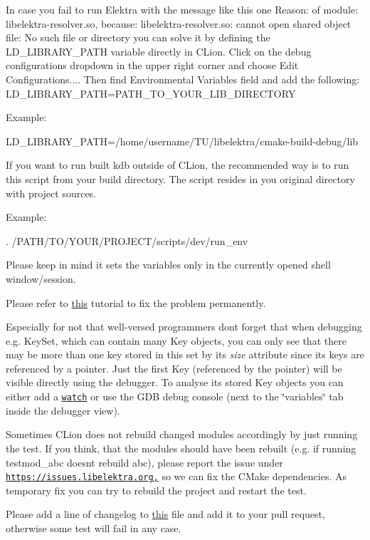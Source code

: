 In case you fail to run Elektra with the message like this one {\ttfamily Reason\+: of module\+: libelektra-\/resolver.\+so, because\+: libelektra-\/resolver.\+so\+: cannot open shared object file\+: No such file or directory} you can solve it by defining the L\+D\+\_\+\+L\+I\+B\+R\+A\+R\+Y\+\_\+\+P\+A\+TH variable directly in C\+Lion. Click on the debug configurations dropdown in the upper right corner and choose \textquotesingle{}Edit Configurations...\textquotesingle{}. Then find \textquotesingle{}Environmental Variables\textquotesingle{} field and add the following\+: L\+D\+\_\+\+L\+I\+B\+R\+A\+R\+Y\+\_\+\+P\+A\+TH=P\+A\+T\+H\+\_\+\+T\+O\+\_\+\+Y\+O\+U\+R\+\_\+\+L\+I\+B\+\_\+\+D\+I\+R\+E\+C\+T\+O\+RY

Example\+:

L\+D\+\_\+\+L\+I\+B\+R\+A\+R\+Y\+\_\+\+P\+A\+TH=/home/username/\+T\+U/libelektra/cmake-\/build-\/debug/lib

If you want to run built {\ttfamily kdb} outside of C\+Lion, the recommended way is to run this script from your build directory. The script resides in you original directory with project sources.

Example\+:


\begin{DoxyCode}
. /PATH/TO/YOUR/PROJECT/scripts/dev/run\_env
\end{DoxyCode}


Please keep in mind it sets the variables only in the currently opened shell window/session.

Please refer to \hyperlink{doc_COMPILE_md}{this} tutorial to fix the problem permanently.


\begin{DoxyItemize}
\item Especially for not that well-\/versed programmers don\textquotesingle{}t forget that when debugging e.\+g. {\ttfamily Key\+Set}, which can contain many {\ttfamily Key} objects, you can only see that there may be more than one key stored in this set by it\textquotesingle{}s {\itshape size} attribute since it\textquotesingle{}s keys are referenced by a pointer. Just the first {\ttfamily Key} (referenced by the pointer) will be visible directly using the debugger. To analyse it\textquotesingle{}s stored {\ttfamily Key} objects you can either add a \href{https://www.jetbrains.com/help/clion/debug-tool-window-watches.html}{\tt watch} or use the G\+DB debug console (next to the \char`\"{}variables\char`\"{} tab inside the debugger view).
\item Sometimes C\+Lion does not rebuild changed modules accordingly by just running the test. If you think, that the modules should have been rebuilt (e.\+g. if running {\ttfamily testmod\+\_\+abc} doesn\textquotesingle{}t rebuild abc), please report the issue under \href{https://issues.libelektra.org,}{\tt https\+://issues.\+libelektra.\+org,} so we can fix the C\+Make dependencies. As temporary fix you can try to rebuild the project and restart the test.
\item Please add a line of changelog to \hyperlink{doc_news__preparation_next_release_md}{this} file and add it to your pull request, otherwise some test will fail in any case. 
\end{DoxyItemize}